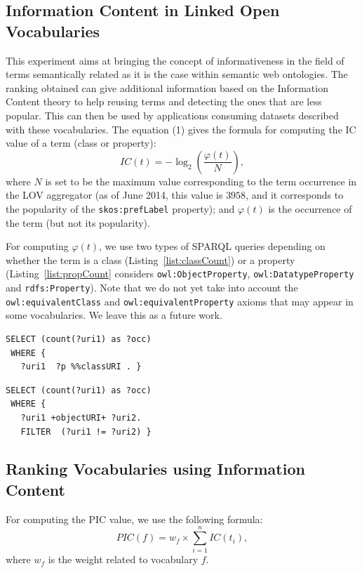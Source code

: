 \begin{description}
\subsection{Information Content in Linked Open Vocabularies}
This experiment aims at bringing the concept of informativeness in the field of terms semantically related as it is the case within semantic web ontologies. The ranking obtained can give additional information based on the Information Content theory to help reusing terms and detecting the ones that are less popular. This can then be used by applications consuming datasets described with these vocabularies. The equation (1) gives the formula for computing the IC value of a term (class or property):
\begin{equation}
 IC(t) = -\log_2(\frac{\varphi(t)}{N}) ,
\end{equation}
where $N$ is set to be the maximum value corresponding to the term occurrence in the LOV aggregator (as of June 2014, this value is $3958$, and it corresponds to the popularity of the \texttt{skos:prefLabel} property); and $\varphi(t)$ is the occurrence of the term (but not its popularity).

For computing $\varphi(t)$, we use two types of SPARQL queries depending on whether the term is a class (Listing~\ref{list:classCount}) or a property (Listing~\ref{list:propCount} considers \texttt{owl:ObjectProperty}, \texttt{owl:Data\-typeProperty} and \texttt{rdfs:Property}). Note that we do not yet take into account the \texttt{owl:equivalentClass} and \texttt{owl:equi\-valentProperty} axioms that may appear in some vocabularies. We leave this as a future work.

\begin{lstlisting}[float=htb,caption={SPARQL query for computing the occurrence of a class },label=list:classCount]
 SELECT (count(?uri1) as ?occ)
 WHERE {
   ?uri1  ?p %%classURI . }
\end{lstlisting}

\begin{lstlisting}[float=htb,caption={SPARQL query for computing the occurrence of a property },label=list:propCount]
 SELECT (count(?uri1) as ?occ)
 WHERE {
   ?uri1 +objectURI+ ?uri2.
   FILTER  (?uri1 != ?uri2) }
\end{lstlisting}

\subsection{Ranking Vocabularies using Information Content}
For computing the PIC value, we use the following formula:
\begin{equation}
 PIC(f) =  w_{f} \times \sum_{i=1}^{n}IC(t_{i})  ,
\end{equation}
where $w_{f}$ is the weight related to vocabulary $f$.


\end{description}
